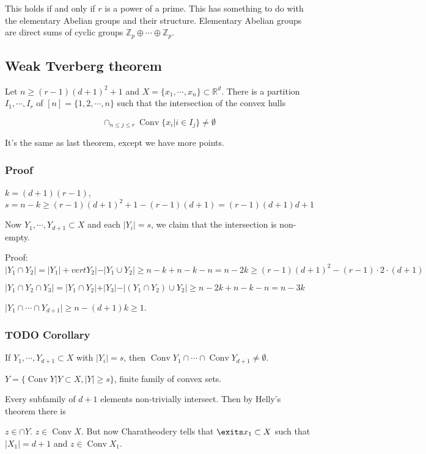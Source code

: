 \documentclass[11pt]{article}
\def\R{\mathbb{R}}
\def\Z{\mathbb{Z}}
\def\conv{\operatorname{Conv}}
\begin{document}
This holds if and only if \(r\) is a power of a prime. This has something to
do with the elementary Abelian groups and their structure. Elementary
Abelian groups are direct sums of cyclic groups \(\Z_p \oplus \cdots \oplus
    \Z_p\).
\subsection{Weak Tverberg theorem}
\label{sec:org50ae427}
Let \(n\ge (r-1)(d+1)^2 + 1\) and \(X = \{x_1, \cdots, x_n\} \subset \R^d\).
There is a partition \(I_1, \cdots, I_r\) of \([n] = \{1, 2, \cdots, n\}\) such
that the intersection of the convex hulls 

$$\cap_{n \le j \le r} \conv\{x_i \vert i \in I_j\} \neq \emptyset$$

It's the same as last theorem, except we have more points.
\subsubsection{Proof}
\label{sec:org3f65b71}
\(k=(d+1)(r-1)\), \(s=n-k \ge (r-1)(d+1)^2 + 1 - (r-1)(d+1) = (r-1)(d+1)d +1\)

Now \(Y_1, \cdots, Y_{d+1} \subset X\) and each \(\vert Y_i\vert = s\), we claim
that the intersection is non-empty.

Proof: \(\vert Y_1 \cap Y_2\vert = \vert Y_1\vert + vert Y_2\vert - \vert Y_1
    \cup Y_2 \vert \ge n-k+n-k-n = n-2k \ge (r-1)(d+1)^2 - (r-1)\cdot 2 \cdot
    (d+1)\)

\(\vert Y_1 \cap Y_2 \cap Y_3 \vert = \vert Y_1 \cap Y_2 \vert + \vert
    Y_3\vert - \vert (Y_1 \cap Y_2) \cup Y_2\vert \ge n-2k+n-k-n = n-3k\)

\(\vert Y_1 \cap \cdots \cap Y_{d+1} \vert \ge n - (d+1)k \ge 1\).
\subsubsection{{\bfseries\sffamily TODO} Corollary}
\label{sec:orgef915c5}
If \(Y_1, \cdots, Y_{d+1} \subset X\) with \(\vert Y_i\vert = s\), then \(\conv
    Y_1 \cap \cdots \cap \conv Y_{d+1} \neq \emptyset\).

\(Y=\{\conv Y\vert Y \subset X, \vert Y\vert \ge s\}\), finite family of
convex sets.

Every subfamily of \(d+1\) elements non-trivially intersect. Then by Helly's
theorem there is

\(z \in \cap Y\). \(z\in \conv X\). But now Charatheodery tells that \(\exits x_1
    \subset X\) such that \(\vert X_1 \vert = d+1\) and \(z \in \conv X_1\).
\end{document}
